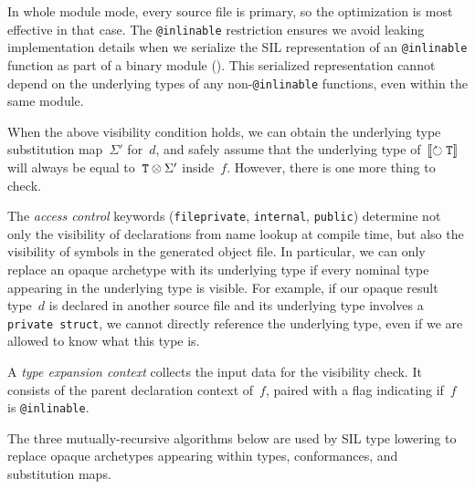 \documentclass[../generics]{subfiles}
\begin{document}
In whole module mode, every source file is primary, so the optimization is most effective in that case. The \verb|@inlinable| restriction ensures we avoid leaking implementation details when we serialize the SIL representation of an \verb|@inlinable| function as part of a binary module (). This serialized representation cannot depend on the underlying types of any non-\verb|@inlinable| functions, even within the same module.

When the above visibility condition holds, we can obtain the underlying type substitution map~$\Sigma'$ for~$d$, and safely assume that the underlying type of~$[\![\circlearrowright \texttt{\texttt{T}}]\!]$ will always be equal to~$\texttt{T} \otimes \Sigma'$ inside~$f$. However, there is one more thing to check.

The \emph{access control} keywords (\texttt{fileprivate}, \texttt{internal}, \texttt{public}) determine not only the visibility of declarations from name lookup at compile time, but also the visibility of symbols in the generated object file. In particular, we can only replace an opaque archetype with its underlying type if every nominal type appearing in the underlying type is visible. For example, if our opaque result type~$d$ is declared in another source file and its underlying type involves a \texttt{private struct}, we cannot directly reference the underlying type, even if we are allowed to know what this type is.

A \emph{type expansion context} collects the input data for the visibility check. It consists of the parent declaration context of~$f$, paired with a flag indicating if~$f$ is \verb|@inlinable|.

The three mutually-recursive algorithms below are used by SIL type lowering to replace opaque archetypes appearing within types, conformances, and substitution maps.
\end{document}
